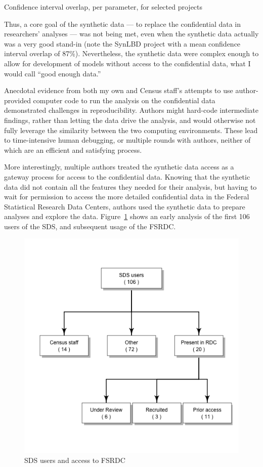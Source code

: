 \documentclass[]{hdsr}
\begin{document}
\begin{table}[]
    \centering
    
    
    \caption{Confidence interval overlap, per parameter, for selected projects}
    \label{tab:overlap}
\end{table}

Thus, a core goal of the synthetic data --- to replace the confidential data in researchers' analyses --- was not being met, even when the synthetic data actually was a very good stand-in (note the SynLBD project with a mean confidence interval overlap of 87\%). Nevertheless, the synthetic data were complex enough to allow for development of models without access to the confidential data, what I would call ``good enough data.''

Anecdotal evidence from both my own and Census staff's attempts to use author-provided computer code to run the analysis on the confidential data demonstrated challenges in reproducibility. Authors might hard-code intermediate findings, rather than letting the data drive the analysis, and would otherwise not fully leverage the similarity between the two computing environments. These lead to time-intensive human debugging, or multiple rounds with authors, neither of which are an efficient and satisfying process. 

More interestingly, multiple authors treated the synthetic data access as a gateway process for access to the confidential data. Knowing that the synthetic data did not contain all the features they needed for their analysis, but having to wait for permission to access the more detailed confidential data in the Federal Statistical Research Data Centers, authors used the synthetic data to prepare analyses and explore the data. Figure~\ref{fig:useRDC} shows an early analysis of the first 106 users of the SDS, and subsequent usage of the FSRDC. 

\begin{figure}
    \centering
    \includegraphics[width=0.5\linewidth]{figs/useRDCgraph.png}
    \caption{SDS users and access to FSRDC}
    \label{fig:useRDC}
\end{figure}
\end{document}
